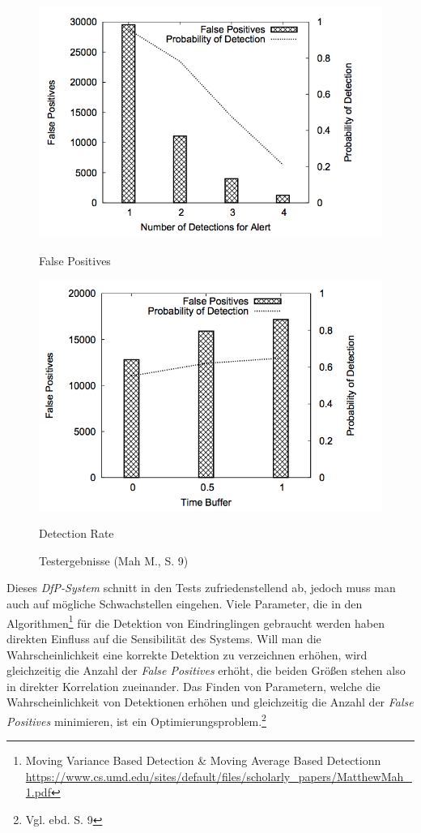 \begin{figure}[H]
\centering
\begin{minipage}{.5\textwidth}
  \centering
  \includegraphics[scale=0.6]{pictures/false_pos}
  \caption*{False Positives}
\end{minipage}%
\begin{minipage}{.5\textwidth}
  \centering
  \includegraphics[scale=0.6]{pictures/detection}
  \caption*{Detection Rate}
\end{minipage}
\caption{Testergebnisse (Mah M., S. 9)}
\end{figure}

Dieses \textit{DfP-System} schnitt in den Tests zufriedenstellend ab, jedoch muss man auch auf mögliche Schwachstellen eingehen. Viele Parameter, die in den Algorithmen\footnote{Moving Variance Based Detection \& Moving Average Based Detectionn \url{https://www.cs.umd.edu/sites/default/files/scholarly_papers/MatthewMah_1.pdf}} für die Detektion von Eindringlingen gebraucht werden haben direkten Einfluss auf die Sensibilität des Systems. Will man die Wahrscheinlichkeit eine korrekte Detektion zu verzeichnen erhöhen, wird gleichzeitig die Anzahl der \textit{False Positives} erhöht, die beiden Größen stehen also in direkter Korrelation zueinander. Das Finden von Parametern, welche die Wahrscheinlichkeit von Detektionen erhöhen und gleichzeitig die Anzahl der \textit{False Positives} minimieren, ist ein Optimierungsproblem.\footnote{Vgl. ebd. S. 9}

